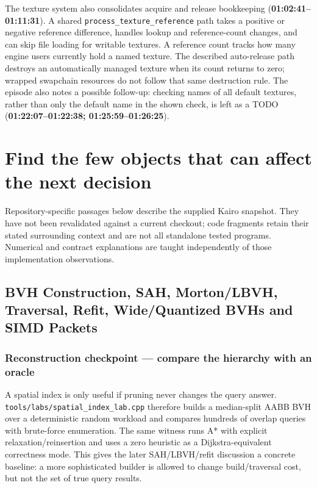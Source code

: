The texture system also consolidates acquire and release bookkeeping (\textbf{01:02:41--01:11:31}). A shared \texttt{process\_texture\_reference} path takes a positive or negative reference difference, handles lookup and reference-count changes, and can skip file loading for writable textures. A reference count tracks how many engine users currently hold a named texture. The described auto-release path destroys an automatically managed texture when its count returns to zero; wrapped swapchain resources do not follow that same destruction rule. The episode also notes a possible follow-up: checking names of all default textures, rather than only the default name in the shown check, is left as a TODO (\textbf{01:22:07--01:22:38; 01:25:59--01:26:25}).

\section{Find the few objects that can affect the next decision}\label{06-engine-ii-ch027-find-the-few-objects-that-can-affect-the-next-decision}

Repository-specific passages below describe the supplied Kairo snapshot. They have not been revalidated against a current checkout; code fragments retain their stated surrounding context and are not all standalone tested programs. Numerical and contract explanations are taught independently of those implementation observations.

\subsection{BVH Construction, SAH, Morton/LBVH, Traversal, Refit, Wide/Quantized BVHs and SIMD Packets}\label{06-engine-ii-ch027-bvh-construction-sah-mortonlbvh-traversal-refit-widequantized-bvhs-and-simd-packets}

\subsubsection{Reconstruction checkpoint --- compare the hierarchy with an oracle}\label{06-engine-ii-ch027-reconstruction-checkpoint-compare-the-hierarchy-with-an-oracle}

A spatial index is only useful if pruning never changes the query answer. \texttt{tools/labs/spatial\_index\_lab.cpp} therefore builds a median-split AABB BVH over a deterministic random workload and compares hundreds of overlap queries with brute-force enumeration. The same witness runs A* with explicit relaxation/reinsertion and uses a zero heuristic as a Dijkstra-equivalent correctness mode. This gives the later SAH/LBVH/refit discussion a concrete baseline: a more sophisticated builder is allowed to change build/traversal cost, but not the set of true query results.

